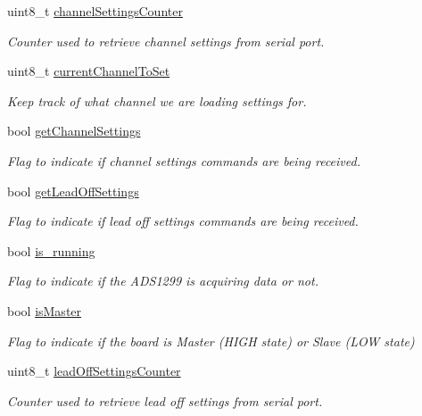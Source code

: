 \begin{DoxyCompactItemize}
\item 
uint8\+\_\+t \hyperlink{group__Devices__Library_gac064adc9b9dc0e68d43cf71bd52a0fdb}{channel\+Settings\+Counter}
\begin{DoxyCompactList}\small\item\em Counter used to retrieve channel settings from serial port. \end{DoxyCompactList}\item 
uint8\+\_\+t \hyperlink{group__Devices__Library_ga15bd8e07189205b21eb37b666895ee0e}{current\+Channel\+To\+Set}
\begin{DoxyCompactList}\small\item\em Keep track of what channel we are loading settings for. \end{DoxyCompactList}\item 
bool \hyperlink{group__Devices__Library_ga7ef266ee79910e6754e8783b550b4a0a}{get\+Channel\+Settings}
\begin{DoxyCompactList}\small\item\em Flag to indicate if channel settings commands are being received. \end{DoxyCompactList}\item 
bool \hyperlink{group__Devices__Library_ga774931d6c0caa199a9884bce2b300439}{get\+Lead\+Off\+Settings}
\begin{DoxyCompactList}\small\item\em Flag to indicate if lead off settings commands are being received. \end{DoxyCompactList}\item 
bool \hyperlink{group__Devices__Library_ga95cbd6b99430748422cc048b4f29dc52}{is\+\_\+running}
\begin{DoxyCompactList}\small\item\em Flag to indicate if the A\+D\+S1299 is acquiring data or not. \end{DoxyCompactList}\item 
bool \hyperlink{group__Devices__Library_ga6ceb9b5a0a67762763468c0ac71705fe}{is\+Master}
\begin{DoxyCompactList}\small\item\em Flag to indicate if the board is Master (H\+I\+GH state) or Slave (L\+OW state) \end{DoxyCompactList}\item 
uint8\+\_\+t \hyperlink{group__Devices__Library_gacaa36aec7dee3c3535b27afc88dcfc9c}{lead\+Off\+Settings\+Counter}
\begin{DoxyCompactList}\small\item\em Counter used to retrieve lead off settings from serial port. \end{DoxyCompactList}\item 

\end{DoxyCompactItemize}
